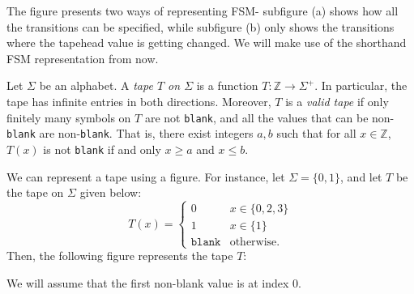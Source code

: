 The figure presents two ways of representing FSM- subfigure (a) shows how all the transitions can be specified, while subfigure (b) only shows the transitions where the tapehead value is getting changed. We will make use of the shorthand FSM representation from now.

Let $\Sigma$ be an alphabet. A \emph{tape $T$ on $\Sigma$} is a function $T\colon \mathbb{Z} \to \Sigma^+$. In particular, the tape has infinite entries in both directions. Moreover, $T$ is a \emph{valid tape} if only finitely many symbols on $T$ are not \texttt{blank}, and all the values that can be non-\texttt{blank} are non-\texttt{blank}. That is, there exist integers $a, b$ such that for all $x \in \mathbb{Z}$, $T(x)$ is not \texttt{blank} if and only $x \geq a$ and $x \leq b$. 

We can represent a tape using a figure. For instance, let $\Sigma = \{0, 1\}$, and let $T$ be the tape on $\Sigma$ given below:
\[T(x) = \begin{cases}
    0 & x \in \{0, 2, 3\} \\
    1 & x \in \{1\} \\
    \texttt{blank} & \text{otherwise}.
\end{cases}\]
Then, the following figure represents the tape $T$:
\begin{figure}[H]
    \centering
\end{figure}
We will assume that the first non-blank value is at index 0.

